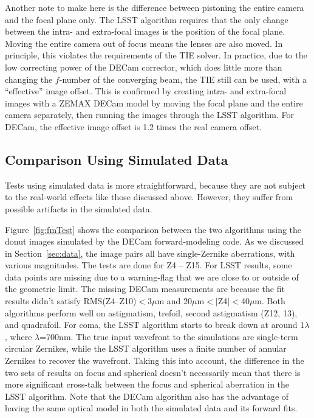 \documentclass[]{spie}  %
\begin{document}
Another note to make here is the difference between pistoning the entire camera and the focal plane only.
The LSST algorithm requires that the only change between the intra- and extra-focal images is the position of the focal plane. Moving the entire camera out of focus means the lenses are also moved. In principle, this violates the requirements of the TIE solver.
In practice, due to the low correcting power of the DECam corrector, which does little more than changing the $f$-number of the converging beam, the TIE still can be used, with a ``effective'' image offset.
This is confirmed by creating intra- and extra-focal images with a ZEMAX DECam model by moving the focal plane and the entire camera separately, then running the images through the LSST algorithm.
For DECam, the effective image offset is 1.2 times the real camera offset.

\subsection{Comparison Using Simulated Data}

Tests using simulated data is more straightforward, because they are not subject to the real-world effects like those discussed above. However, they suffer from possible artifacts in the simulated data.
		  
Figure~\ref{fig:fmTest} shows the comparison between the two algorithms using the donut images simulated by the DECam forward-modeling code.
As we discussed in Section~\ref{sec:data}, the image pairs all have single-Zernike aberrations, with various magnitudes. The tests are done for Z4 -- Z15.
For LSST results, some data points are missing due to a warning-flag that we are close to or outside of the geometric limit.
The missing DECam measurements are because the fit results didn't satisfy RMS(Z4--Z10)$<$3$\mu$m and 
20$\mu$m$<|$Z4$|<$40$\mu$m.
Both algorithms perform well on astigmatism, trefoil, second astigmatism (Z12, 13), and quadrafoil.
For coma, the LSST algorithm starts to break down at around 1$\lambda$, where $\lambda$=700nm.
The true input wavefront to the simulations are single-term circular Zernikes,
while the LSST algorithm uses a finite number of annular Zernikes to recover the wavefront.
Taking this into account, the difference in the two sets of results on focus and spherical
doesn't necessarily mean that there is more significant cross-talk between the focus and spherical aberration in the LSST algorithm. 
Note that the DECam algorithm also has the advantage of having the same optical model in both the simulated data and its forward fits.
\end{document}
